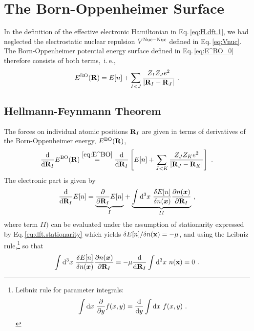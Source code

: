 \newpage

\section{The Born-Oppenheimer Surface}
In the definition of the effective electronic Hamiltonian in Eq.\,\eqref{eq:H.dft.1}, we had neglected the electrostatic nuclear repulsion $V^{\rm Nuc-Nuc}$ defined in Eq.\,\eqref{eq:Vnuc}. The Born-Oppenheimer potential energy surface defined in Eq.\,\eqref{eq:E^BO_0} therefore consists of both terms,~i.\,e.,
\begin{align}
	E^{\rm BO} ({\bf R}) 
		= E[n] + \sum_{I < J} \frac{Z_{I} Z_{J} e^{2}}{\left|{\bf R}_{I}-{\bf R}_{J}\right|}~.
	\label{eq:E^BO}
\end{align}

\subsection{Hellmann-Feynmann Theorem}
\label{sec:HellmannFeynman}
The forces on individual atomic positions ${\bf R}_I$ are given in terms of derivatives of the Born-Oppenheimer energy, $E^{\rm BO} ({\bf R})$,
\begin{align}
	\frac{\d}{\d {\bf R}_I} E^{\rm BO} ({\bf R})
		\stackrel{\eqref{eq:E^BO}}{=}
			\frac{\d}{\d {\bf R}_I } \left[
				E[n] + \sum_{J < K} \frac{Z_{J} Z_{K} e^{2}}{\left|{\b R}_{J}-{\bf R}_{K}\right|}
			\right]
			~.
	\label{eq:hellmannfeynman.1}
\end{align}
The electronic part is given by
\begin{align}
		\frac{\d}{\d {\bf R}_I} E[n]
			= 
				\underset{I}{\underbrace{\frac{\partial}{\partial {\bf R}_I} E[n]}}
			+ \underset{II}{\underbrace{
					\int \d^{3} x ~ \frac{\delta E[n]}{\delta n(\boldsymbol{x})} \frac{\partial n(\boldsymbol{x})}{\partial {\bf R}_{I}}
				}}~,
		\label{eq:hellmannfeynman.2}
\end{align}
where term $II)$ can be evaluated under the assumption of stationarity expressed by Eq.\,\eqref{eq:dft.stationarity} which yields 
\mbox{$\delta E[n] / \delta n({\bf x}) = -\mu$},
and using the Leibniz rule,\footnote{Leibniz rule for parameter integrals:
	\begin{align*}
		\int {\rm d} x ~ \frac{\partial}{\partial y} f(x, y) 
			= \frac{{\rm d}}{{\rm d} y} \int {\rm d} x ~ f(x, y)~.
	\end{align*}
} so that
\begin{align}
	\int \d^{3} x ~ \frac{\delta E[n]}{\delta n(\boldsymbol{x})} \frac{\partial n(\boldsymbol{x})}{\partial {\bf R}_{I}}
	= -\mu \frac{\d}{\d {\bf R}_I} \int \d^{3} x ~ n ({\bf x})
	= 0~.
	\label{eq:hellmannfeynman.3}
\end{align}
